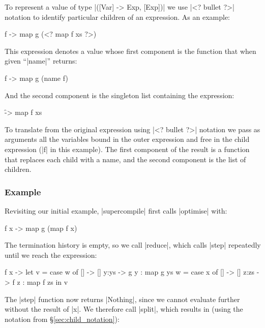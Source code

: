 \documentclass[draft]{sigplanconf}
\begin{document}
To represent a value of type |([Var] -> Exp, [Exp])| we use |<? bullet ?>| notation to identify particular children of an expression. As an example:

\begin{code}
\g f -> map g (<? map f xs ?>)
\end{code}

\noindent This expression denotes a value whose first component is the function that when given ``|name|'' returns:

\begin{code}
\g f -> map g (name f)
\end{code}

\noindent And the second component is the singleton list containing the expression:

\begin{code}
\f -> map f xs
\end{code}

To translate from the original expression using |<? bullet ?>| notation we pass as arguments all the variables bound in the outer expression and free in the child expression (|f| in this example). The first component of the result is a function that replaces each child with a name, and the second component is the list of children.

\subsubsection{Example}
\label{sec:manager_example}

Revisiting our initial example, |supercompile| first calls |optimise| with:

\begin{code}
\g f x -> map g (map f x)
\end{code}

The termination history is empty, so we call |reduce|, which calls |step| repeatedly until we reach the expression:

\begin{code}
\g f x ->  let  v = case  w of
                          []    -> []
                          y:ys  -> g y : map g ys
                w = case  x of
                          []    -> []
                          z:zs  -> f z : map f zs
           in   v
\end{code}

The |step| function now returns |Nothing|, since we cannot evaluate further without the result of |x|. We therefore call |split|, which results in (using the notation from \S\ref{sec:child_notation}):
\end{document}
